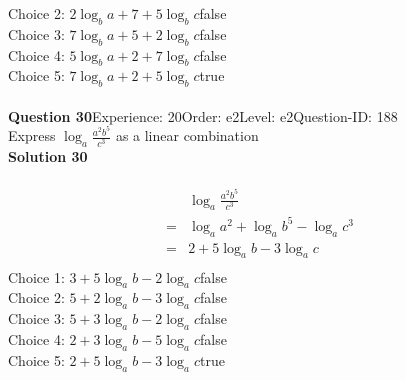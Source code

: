 \documentclass{article}
\begin{document}
Choice 2: \hspace{20pt}$2\log_{b}a+7+5\log_{b}c$\hspace{20pt}false\\
Choice 3: \hspace{20pt}$7\log_{b}a+5+2\log_{b}c$\hspace{20pt}false\\
Choice 4: \hspace{20pt}$5\log_{b}a+2+7\log_{b}c$\hspace{20pt}false\\
Choice 5: \hspace{20pt}$7\log_{b}a+2+5\log_{b}c$\hspace{20pt}true\\
\\[4pt]
\noindent\textbf{Question 30}\hspace{20pt}Experience: 20\hspace{20pt}Order: e2\hspace{20pt}Level: e2\hspace{20pt}Question-ID: 188\\[2pt]
Express $\log_{a}\displaystyle\frac{a^2b^5}{c^3}$ as a linear combination\\[4pt]
\noindent\textbf{Solution 30}\\[2pt]
\\[-35pt]\begin{align*}
&\log_{a}\displaystyle\frac{a^2b^5}{c^3}\\[2pt]
=&\log_{a}a^2+\log_{a}b^5-\log_{a}c^3\\[2pt]
=&2+5\log_{a}b-3\log_{a}c\\[-50pt]
\end{align*}
Choice 1: \hspace{20pt}$3+5\log_{a}b-2\log_{a}c$\hspace{20pt}false\\
Choice 2: \hspace{20pt}$5+2\log_{a}b-3\log_{a}c$\hspace{20pt}false\\
Choice 3: \hspace{20pt}$5+3\log_{a}b-2\log_{a}c$\hspace{20pt}false\\
Choice 4: \hspace{20pt}$2+3\log_{a}b-5\log_{a}c$\hspace{20pt}false\\
Choice 5: \hspace{20pt}$2+5\log_{a}b-3\log_{a}c$\hspace{20pt}true\\
\end{document}

